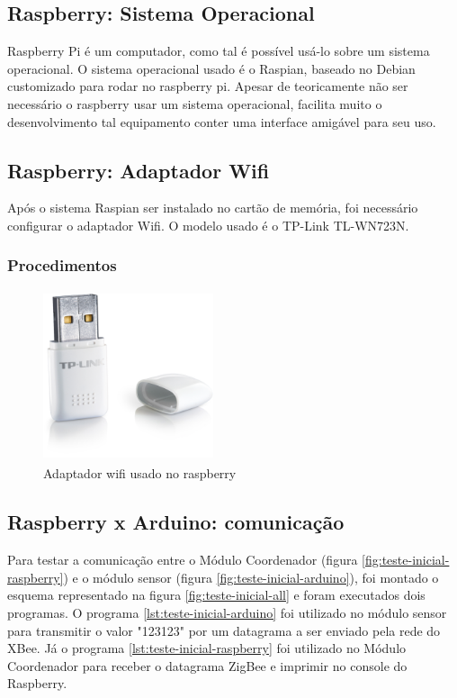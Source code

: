 \subsection{Raspberry: Sistema Operacional}

Raspberry Pi é um computador, como tal é possível usá-lo sobre um sistema operacional. O sistema operacional usado é o Raspian, baseado no Debian customizado para rodar no raspberry pi. Apesar de teoricamente não ser necessário o raspberry usar um sistema operacional, facilita muito o desenvolvimento tal equipamento conter uma interface amigável para seu uso.

\subsection{Raspberry: Adaptador Wifi}

Após o sistema Raspian ser instalado no cartão de memória, foi necessário configurar o adaptador Wifi. O modelo usado é o TP-Link TL-WN723N.

\subsubsection{Procedimentos}

\begin{figure}[H]
\centering
\includegraphics[width=5cm,height=5cm,keepaspectratio]{figuras/wifi-adapter.jpg}
\caption{\label{fig:wifi-adapter} Adaptador wifi usado no raspberry}
\end{figure}

\subsection{Raspberry x Arduino: comunicação}

Para testar a comunicação entre o Módulo Coordenador (figura \ref{fig:teste-inicial-raspberry}) e o módulo sensor (figura \ref{fig:teste-inicial-arduino}), foi montado o esquema representado na figura \ref{fig:teste-inicial-all} e foram executados dois programas. O programa \ref{lst:teste-inicial-arduino} foi utilizado no módulo sensor para transmitir o valor "123123" por um datagrama a ser enviado pela rede do XBee. Já o programa \ref{lst:teste-inicial-raspberry} foi utilizado no Módulo Coordenador para receber o datagrama ZigBee e imprimir no console do Raspberry.

